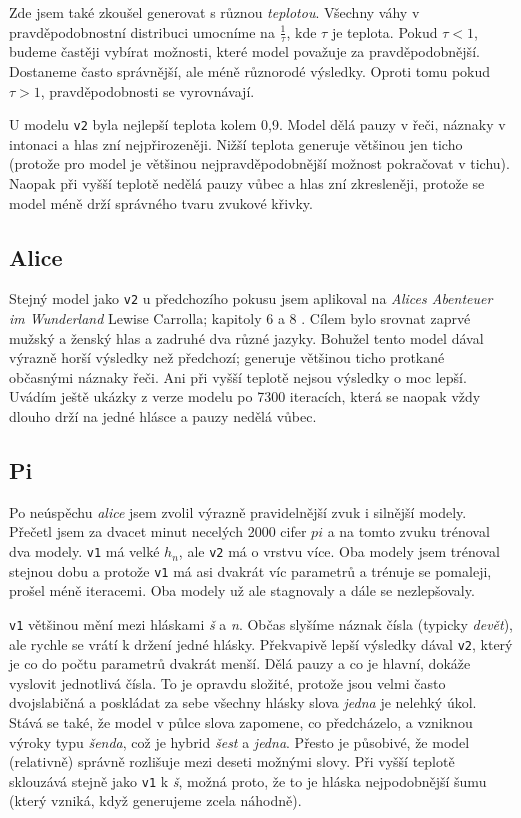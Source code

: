 \documentclass[a4]{article}
\begin{document}
Zde jsem také zkoušel generovat s různou \textit{teplotou}. Všechny váhy v pravděpodobnostní distribuci umocníme na $\frac{1}{\tau}$, kde $\tau$ je teplota. Pokud $\tau<1$, budeme častěji vybírat možnosti, které model považuje za pravděpodobnější. Dostaneme často správnější, ale méně různorodé výsledky. Oproti tomu pokud $\tau > 1$, pravděpodobnosti se vyrovnávají.

U modelu \verb|v2| byla nejlepší teplota kolem 0,9. Model dělá pauzy v řeči, náznaky v intonaci a hlas zní nejpřirozeněji. Nižší teplota generuje většinou jen ticho (protože pro model je většinou nejpravděpodobnější možnost pokračovat v tichu). Naopak při vyšší teplotě nedělá pauzy vůbec a hlas zní zkresleněji, protože se model méně drží správného tvaru zvukové křivky.

\subsection{Alice}
Stejný model jako \verb|v2| u předchozího pokusu jsem aplikoval na \textit{Alices Abenteuer im Wunderland} Lewise Carrolla; kapitoly 6 a 8 \cite{alice}. Cílem bylo srovnat zaprvé mužský a ženský hlas a zadruhé dva různé jazyky. Bohužel tento model dával výrazně horší výsledky než předchozí; generuje většinou ticho protkané občasnými náznaky řeči. Ani při vyšší teplotě nejsou výsledky o moc lepší. Uvádím ještě ukázky z verze modelu po 7300 iteracích, která se naopak vždy dlouho drží na jedné hlásce a pauzy nedělá vůbec.

\subsection{Pi}
Po neúspěchu \textit{alice} jsem zvolil výrazně pravidelnější zvuk i silnější modely. Přečetl jsem za dvacet minut necelých 2000 cifer $pi$ a na tomto zvuku trénoval dva modely. \verb|v1| má velké $h_n$, ale \verb|v2| má o vrstvu více. Oba modely jsem trénoval stejnou dobu a protože \verb|v1| má asi dvakrát víc parametrů a trénuje se pomaleji, prošel méně iteracemi. Oba modely už ale stagnovaly a dále se nezlepšovaly.

\verb|v1| většinou mění mezi hláskami \textit{š} a \textit{n}. Občas slyšíme náznak čísla (typicky \textit{devět}), ale rychle se vrátí k držení jedné hlásky.
Překvapivě lepší výsledky dával \verb|v2|, který je co do počtu parametrů dvakrát menší. Dělá pauzy a co je hlavní, dokáže vyslovit jednotlivá čísla. To je opravdu složité, protože jsou velmi často dvojslabičná a poskládat za sebe všechny hlásky slova \textit{jedna} je nelehký úkol. Stává se také, že model v půlce slova zapomene, co předcházelo, a vzniknou výroky typu \textit{šenda}, což je hybrid \textit{šest} a \textit{jedna}. Přesto je působivé, že model (relativně) správně rozlišuje mezi deseti možnými slovy.
Při vyšší teplotě sklouzává stejně jako \verb|v1| k \textit{š}, možná proto, že to je hláska nejpodobnější šumu (který vzniká, když generujeme zcela náhodně).
\end{document}
